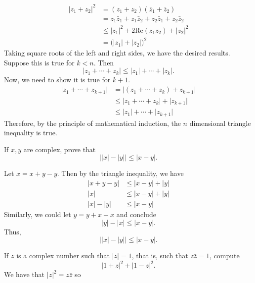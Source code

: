 \begin{exercise}
  \begin{align*}
    \lvert z_1 + z_2\rvert^2 & = (z_1 + z_2)(\bar{z}_1 + \bar{z}_2)\\
                             & = z_1\bar{z}_1 + z_1\bar{z}_2 + z_2\bar{z}_1 +
                               z_2\bar{z}_2\\
                             & \leq\lvert z_1\rvert^2 + 2\text{Re}(z_1z_2) +
                               \lvert z_2\rvert^2\\
                             & = \bigl(\lvert z_1\rvert + \lvert
                               z_2\rvert\bigr)^2 
  \end{align*}
  Taking square roots of the left and right sides, we have the desired results.
  Suppose this is true for \(k < n\).
  Then
  \[
  \lvert z_1 + \cdots + z_k\rvert\leq\lvert z_1\rvert + \cdots +
  \lvert z_k\rvert.
  \]
  Now, we need to show it is true for \(k + 1\).
  \begin{align*}
    \lvert z_1 + \cdots + z_{k + 1}\rvert
    & = \lvert (z_1 + \cdots + z_k) + z_{k + 1}\rvert\\
    & \leq\lvert z_1 + \cdots + z_k\rvert + \lvert z_{k + 1}\rvert\\
    & \leq\lvert z_1\rvert + \cdots + \lvert z_{k + 1}\rvert
  \end{align*}
  Therefore, by the principle of mathematical induction, the \(n\) dimensional
  triangle inequality is true.
\item
  If \(x, y\) are complex, prove that
  \[
  \bigl\lvert\lvert x\rvert - \lvert y\rvert\bigr\rvert\leq\lvert x - y\rvert.
  \]
  \par\smallskip
  Let \(x = x + y - y\).
  Then by the triangle inequality, we have
  \begin{align*}
    \lvert x + y - y\rvert
    & \leq \lvert x - y\rvert + \lvert y\rvert\\
    \lvert x\rvert & \leq \lvert x - y\rvert + \lvert y\rvert\\
    \lvert x\rvert - \lvert y\rvert & \leq \lvert x - y\rvert
  \end{align*}
  Similarly, we could let \(y = y + x - x\) and conclude
  \[
  \lvert y\rvert - \lvert x\rvert\leq\lvert x - y\rvert.
  \]
  Thus,
  \[
  \bigl\lvert\lvert x\rvert - \lvert y\rvert\bigr\rvert\leq\lvert x - y\rvert.
  \]
\item
  If \(z\) is a complex number such that \(\lvert z\rvert = 1\), that is, such
  that \(z\bar{z} = 1\), compute
  \[
  \lvert 1 + z\rvert^2 + \lvert 1 - z\rvert^2.
  \]
  We have that \(\lvert z\rvert^2 = z\bar{z}\) so

\end{exercise}
